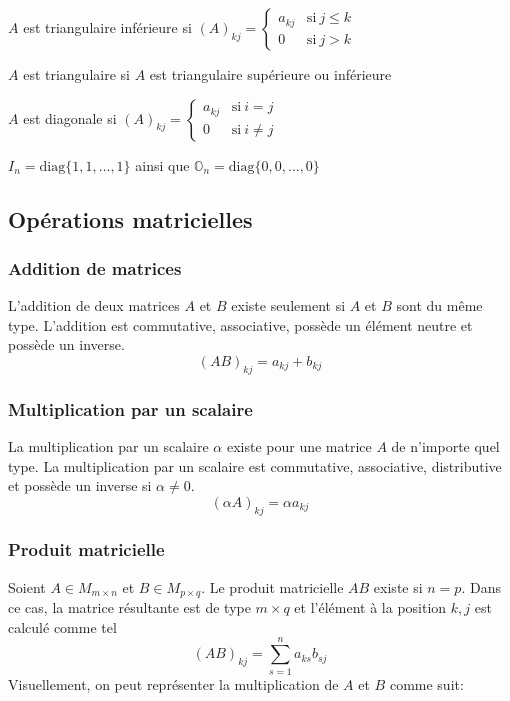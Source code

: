 \begin{definition}
    $A$ est triangulaire inférieure si $(A)_{kj} = \begin{cases}
            a_{kj} & \text{si} \ j \leq k \\
            0      & \text{si} \ j > k
        \end{cases}$
\end{definition}
\begin{remark}
    $A$ est triangulaire si $A$ est triangulaire supérieure ou inférieure
\end{remark}
\begin{definition}
    $A$ est diagonale si $(A)_{kj} = \begin{cases}
            a_{kj} & \text{si} \ i = j    \\
            0      & \text{si} \ i \neq j
        \end{cases}$
    \begin{remark}
        $I_n = \text{diag}\{ 1, 1, \dots, 1 \}$ ainsi que $\mathbb{O}_n = \text{diag}\{ 0, 0, \dots, 0 \}$
    \end{remark}
\end{definition}


\subsection{Opérations matricielles}

\subsubsection{Addition de matrices}
L'addition de deux matrices $A$ et $B$ existe seulement si $A$ et $B$ sont du même type.
L'addition est commutative, associative, possède un élément neutre et possède un inverse.
\[ (AB)_{kj} = a_{kj} + b_{kj} \]

\subsubsection{Multiplication par un scalaire}
La multiplication par un scalaire $\alpha$ existe pour une matrice $A$ de n'importe quel type. La multiplication
par un scalaire est commutative, associative, distributive et possède un inverse si $\alpha \neq 0$.
\[ (\alpha A)_{kj} = \alpha a_{kj}\]

\subsubsection{Produit matricielle}
Soient $A \in M_{m \times n}$ et $B \in M_{p \times q}$. 
Le produit matricielle $AB$ existe si $n = p$. Dans ce cas, la matrice résultante est de type $m \times q$ et l'élément à la position $k, j$ est calculé comme tel
\[ (AB)_{kj} = \sum_{s = 1}^{n} a_{ks} b_{sj} \]
Visuellement, on peut représenter la multiplication de $A$ et $B$ comme suit:

